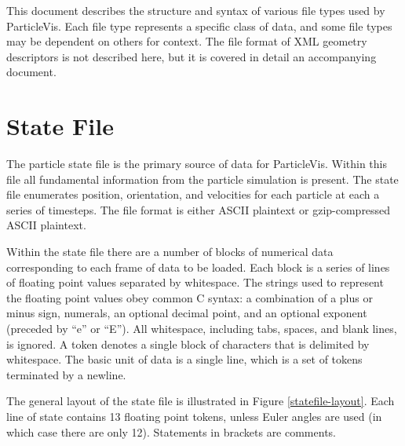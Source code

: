 \label{FileFormats}

This document describes the structure and syntax of various file types used by ParticleVis.  Each file type represents a specific class of data, and some file types may be dependent on others for context.  The file format of XML geometry descriptors is not described here, but it is covered in detail an accompanying document.

\section{State File}
The particle state file is the primary source of data for ParticleVis.  Within this file all fundamental information from the particle simulation is present.  The state file enumerates position, orientation, and velocities for each particle at each a series of timesteps.  The file format is either ASCII plaintext or gzip-compressed ASCII plaintext.

Within the state file there are a number of blocks of numerical data corresponding to each frame of data to be loaded.  Each block is a series of lines of floating point values separated by whitespace.  The strings used to represent the floating point values obey common C syntax: a combination of a plus or minus sign, numerals, an optional decimal point, and an optional exponent (preceded by ``e'' or ``E'').  All whitespace, including tabs, spaces, and blank lines, is ignored.  A token denotes a single block of characters that is delimited by whitespace.  The basic unit of data is a single line, which is a set of tokens terminated by a newline.

The general layout of the state file is illustrated in Figure \ref{statefile-layout}.  Each line of state contains 13 floating point tokens, unless Euler angles are used (in which case there are only 12).  Statements in brackets are comments.

